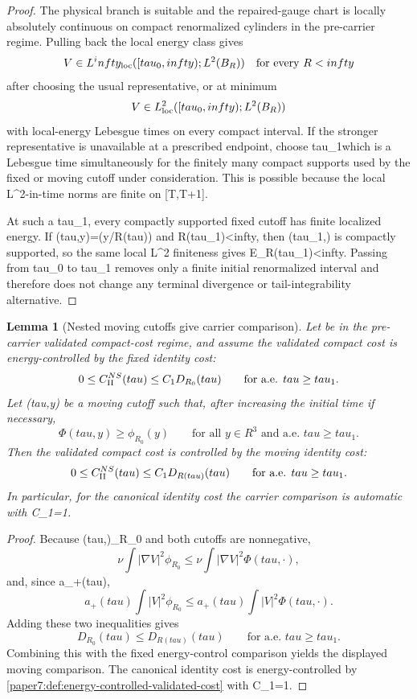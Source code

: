 \documentclass[11pt]{amsart}
\def\({}%
\def\){}%
\def\tilde#1{#1}%
\def\mathfrak#1{#1}%
\def\mathbb#1{#1}%
\def\tau{tau}%
\def\infty{infty}%
\theoremstyle{plain}
\newtheorem{lemma}[lemma]{Lemma}
\theoremstyle{definition}
\theoremstyle{remark}
\begin{document}
\begin{proof}
The physical branch is suitable and the repaired-gauge chart is locally
absolutely continuous on compact renormalized cylinders in the pre-carrier
regime.  Pulling back the local energy class gives
\[
  V\in L^\infty_{\rm loc}([\tau_0,\infty);L^2(B_R))
  \quad\text{for every }R<\infty
\]
after choosing the usual representative, or at minimum
\[
  V\in L^2_{\rm loc}([\tau_0,\infty);L^2(B_R))
\]
with local-energy Lebesgue times on every compact interval.  If the stronger
representative is unavailable at a prescribed endpoint, choose
\(\tau_1\in[T,T+1]\) which is a Lebesgue time simultaneously for the finitely
many compact supports used by the fixed or moving cutoff under consideration.
This is possible because the local \(L^2\)-in-time norms are finite on
\([T,T+1]\).
\par
At such a \(\tau_1\), every compactly supported fixed cutoff has finite
localized energy.  If \(\Phi(\tau,y)=\phi(y/R(\tau))\) and
\(R(\tau_1)<\infty\), then \(\Phi(\tau_1,\cdot)\) is compactly supported, so
the same local \(L^2\) finiteness gives \(\mathcal E_R(\tau_1)<\infty\).
Passing from \(\tau_0\) to \(\tau_1\) removes only a finite initial
renormalized interval and therefore does not change any terminal divergence or
tail-integrability alternative.
\end{proof}

\begin{lemma}[Nested moving cutoffs give carrier comparison]
\label{paper7:lem:nested-moving-carrier-comparison}
Let \(\omega\) be in the pre-carrier validated compact-cost regime, and
assume the validated compact cost is energy-controlled by the fixed identity
cost:
\[
  0\le \mathfrak C_{\rm II}^{NS}(\tau)
  \le C_1\tilde{\mathfrak D}_{R_0}(\tau)
  \qquad\text{for a.e. }\tau\ge\tau_1 .
\]
Let \(\Phi(\tau,y)\) be a moving cutoff such that, after increasing the initial
time if necessary,
\[
  \Phi(\tau,y)\ge \phi_{R_0}(y)
  \qquad\text{for all }y\in\mathbb R^3
  \text{ and a.e. }\tau\ge\tau_1 .
\]
Then the validated compact cost is controlled by the moving identity cost:
\[
  0\le \mathfrak C_{\rm II}^{NS}(\tau)
  \le C_1\tilde{\mathfrak D}_{R(\tau)}(\tau)
  \qquad\text{for a.e. }\tau\ge\tau_1 .
\]
In particular, for the canonical identity cost the carrier comparison is
automatic with \(C_1=1\).
\end{lemma}

\begin{proof}
Because \(\Phi(\tau,\cdot)\ge\phi_{R_0}\) and both cutoffs are nonnegative,
\[
  \nu\int |\nabla V|^2\phi_{R_0}
  \le
  \nu\int |\nabla V|^2\Phi(\tau,\cdot),
\]
and, since \(a_+(\tau)\),
\[
  a_+(\tau)\int |V|^2\phi_{R_0}
  \le
  a_+(\tau)\int |V|^2\Phi(\tau,\cdot).
\]
Adding these two inequalities gives
\[
  \tilde{\mathfrak D}_{R_0}(\tau)
  \le
  \tilde{\mathfrak D}_{R(\tau)}(\tau)
  \qquad\text{for a.e. }\tau\ge\tau_1 .
\]
Combining this with the fixed energy-control comparison yields the displayed
moving comparison.  The canonical identity cost is energy-controlled by
\cref{paper7:def:energy-controlled-validated-cost} with \(C_1=1\).
\end{proof}
\end{document}
